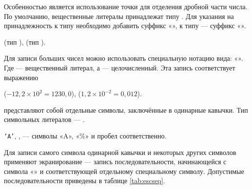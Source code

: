 Особенностью 
является использование точки для отделения дробной части числа. По
умолчанию, вещественные литералы принадлежат типу . Для
указания на принадлежность к типу  необходимо добавить
суффикс «», к типу  — суффикс «».

\begin{example}
   (тип ),  (тип
  ).
\end{example}

Для записи больших чисел можно использовать специальную нотацию вида:
«».  Где
 — вещественный литерал, а
 — целочисленный. Эта запись соответствует
выражению

\begin{example}
   ($-12{,}2\times10^{2}=1230{,}0$), 
  ($1{,}2\times10^{-2}=0{,}012$).
\end{example}

 представляют собой
отдельные символы, заключённые в одинарные кавычки. Тип символьных
литералов — .

\begin{example}
  \texttt{'A'}, ,  — символы «A», «\%» и
  пробел соответственно.
\end{example}

Для записи самого символа одинарной кавычки и некоторых других
символов применяют экранирование — запись последовательности,
начинающейся с символа «\Lst{\textbackslash{}}» и соответствующей
отдельному специальному символу. Допустимые последовательности
приведены в таблице \ref{tab:escseq}.

